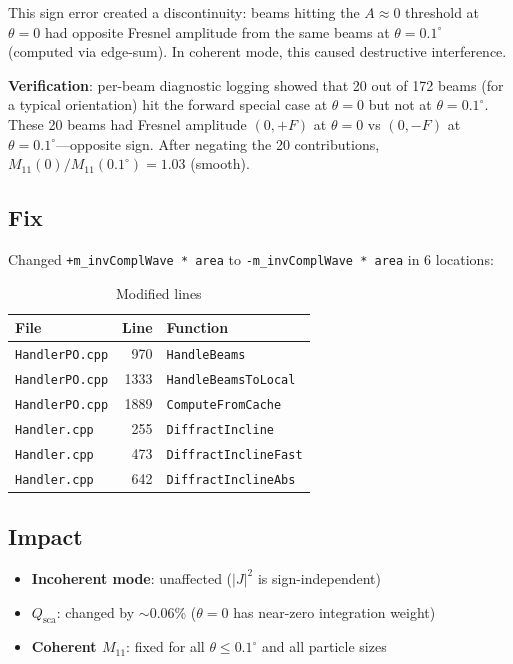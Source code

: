 \documentclass[11pt,a4paper]{article}
\begin{document}
This sign error created a discontinuity: beams hitting the $A{\approx}0$ threshold at $\theta=0$
had opposite Fresnel amplitude from the same beams at $\theta=0.1^\circ$ (computed via edge-sum).
In coherent mode, this caused destructive interference.

\textbf{Verification}: per-beam diagnostic logging showed that 20 out of 172 beams (for a typical
orientation) hit the forward special case at $\theta=0$ but not at $\theta=0.1^\circ$.
These 20 beams had Fresnel amplitude $(0, +F)$ at $\theta=0$ vs $(0, -F)$ at $\theta=0.1^\circ$—opposite sign.
After negating the 20 contributions, $M_{11}(0)/M_{11}(0.1^\circ) = 1.03$ (smooth).

\subsection{Fix}

Changed \texttt{+m\_invComplWave * area} to \texttt{-m\_invComplWave * area} in 6 locations:

\begin{table}[h]\centering
\caption{Modified lines}
\begin{tabular}{lrl}
\toprule
File & Line & Function \\
\midrule
\texttt{HandlerPO.cpp} & 970  & \texttt{HandleBeams} \\
\texttt{HandlerPO.cpp} & 1333 & \texttt{HandleBeamsToLocal} \\
\texttt{HandlerPO.cpp} & 1889 & \texttt{ComputeFromCache} \\
\texttt{Handler.cpp}   & 255  & \texttt{DiffractIncline} \\
\texttt{Handler.cpp}   & 473  & \texttt{DiffractInclineFast} \\
\texttt{Handler.cpp}   & 642  & \texttt{DiffractInclineAbs} \\
\bottomrule
\end{tabular}
\end{table}

\subsection{Impact}

\begin{itemize}
\item \textbf{Incoherent mode}: unaffected ($|J|^2$ is sign-independent)
\item \textbf{$Q_\text{sca}$}: changed by $\sim$0.06\% ($\theta{=}0$ has near-zero integration weight)
\item \textbf{Coherent $M_{11}$}: fixed for all $\theta \leq 0.1^\circ$ and all particle sizes
\end{itemize}
\end{document}
